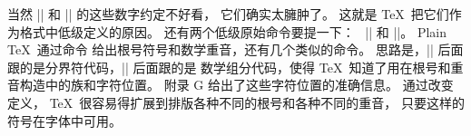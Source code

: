 {{{{{%
\ddanger 当然 |\mathchar| 和 |\delimiter| 的这些数字约定不好看，
它们确实太臃肿了。%
这就是 \TeX\ 把它们作为格式中低级定义的原因。%
还有两个低级原始命令要提一下：
~|\radical| 和 |\mathaccent|。%
Plain \TeX\ 通过命令
\begintt
\def\sqrt{\radical"270370 }
\def\widehat{\mathaccent"362 }
\endtt
给出根号符号和数学重音，还有几个类似的命令。%
思路是，|\radical| 后面跟的是分界符代码，|\mathaccent| 后面跟的是%
数学组分代码，使得 \TeX\ 知道了用在根号和重音构造中的族和字符位置。%
附录 G 给出了这些字符位置的准确信息。%
通过改变定义， \TeX\ 很容易得扩展到排版各种不同的根号和各种不同的重音，
只要这样的符号在字体中可用。

}}}}}
